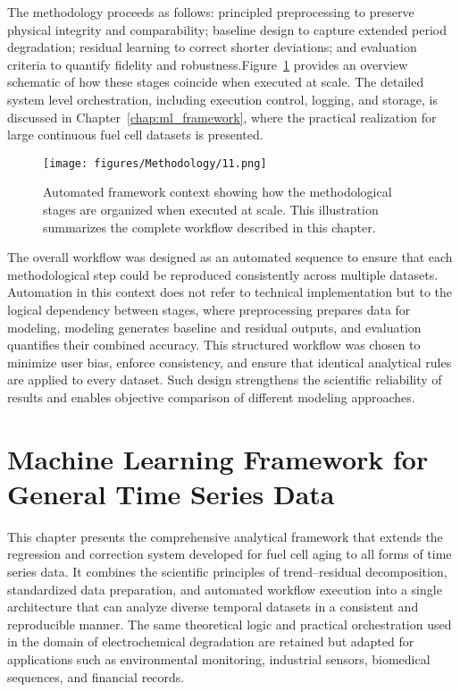 The methodology proceeds as follows: principled preprocessing to preserve physical integrity and comparability; baseline design to capture extended period degradation; residual learning to correct shorter deviations; and evaluation criteria to quantify fidelity and robustness.Figure~\ref{fig:automated_framework} provides an overview schematic of how these stages coincide when executed at scale. The detailed system level orchestration, including execution control, logging, and storage, is discussed in Chapter~\ref{chap:ml_framework}, where the practical realization for large continuous fuel cell datasets is presented.
\begin{figure}[H]
\centering
 \texttt{[image: figures/Methodology/11.png]}
 \caption[Automated framework context for applying the methodology]{Automated framework context showing how the methodological stages are organized when executed at scale. This illustration summarizes the complete workflow described in this chapter.}
 \label{fig:automated_framework}
\end{figure}
The overall workflow was designed as an automated sequence to ensure that each methodological step could be reproduced consistently across multiple datasets. Automation in this context does not refer to technical implementation but to the logical dependency between stages, where preprocessing prepares data for modeling, modeling generates baseline and residual outputs, and evaluation quantifies their combined accuracy. This structured workflow was chosen to minimize user bias, enforce consistency, and ensure that identical analytical rules are applied to every dataset. Such design strengthens the scientific reliability of results and enables objective comparison of different modeling approaches.



\chapter{Machine Learning Framework for General Time Series Data}
\label{chap:ml_framework_timeseries}

This chapter presents the comprehensive analytical framework that extends the regression and correction system developed for fuel cell aging to all forms of time series data. It combines the scientific principles of trend–residual decomposition, standardized data preparation, and automated workflow execution into a single architecture that can analyze diverse temporal datasets in a consistent and reproducible manner. The same theoretical logic and practical orchestration used in the domain of electrochemical degradation are retained but adapted for applications such as environmental monitoring, industrial sensors, biomedical sequences, and financial records.

